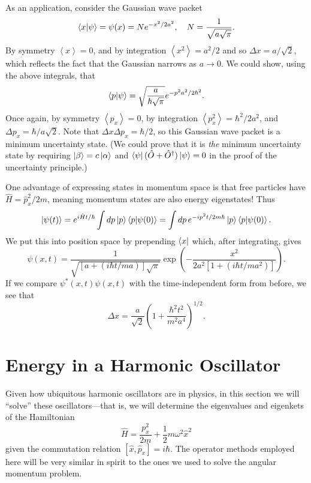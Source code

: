 \documentclass[../p116main.tex]{subfiles}
\begin{document}
As an application, consider the Gaussian wave packet
\[ \left< x \middle| \psi \right> = \psi(x) = N e^{-x^2 / 2a^2}, \quad N = \frac{1}{\sqrt{a \sqrt{\pi}}}. \]
By symmetry $\left< x \right> = 0$, and by integration $\left< x^2 \right> = a^2 / 2$ and so $\Delta x = a / \sqrt{2}$, which reflects the fact that the Gaussian narrows as $a \to 0$.
We could show, using the above integrals, that
\[ \left< p \middle| \psi \right> = \sqrt{\frac{a}{\hbar \sqrt{\pi}}} e^{-p^2 a^2 / 2\hbar^2}. \]
Once again, by symmetry $\left< p_x \right> = 0$, by integration $\left< p_x^2 \right> = \hbar^2 / 2a^2$, and $ \Delta p_x = \hbar / a \sqrt{2}$.
Note that $\Delta x \Delta p_x = \hbar / 2$, so this Gaussian wave packet is a minimum uncertainty state.
(We could prove that it is \textit{the} minimum uncertainty state by requiring $\left| \beta \right> = c \left| \alpha \right>$ and $\left< \psi \right| (\hat O + \hat O^\dagger) \left| \psi \right> = 0$ in the proof of the uncertainty principle.)

One advantage of expressing states in momentum space is that free particles have $\hat H = \hat p_x^2 / 2m$, meaning momentum states are also energy eigenstates!
Thus
\[ \left| \psi(t) \right> = e^{i \hat H t / \hbar} \int dp \left| p \right> \left< p \middle| \psi(0) \right> = \int dp \, e^{-ip^2 t / 2m\hbar} \left| p \right> \left< p \middle| \psi(0) \right>. \]
We put this into position space by prepending $\left< x \right|$ which, after integrating, gives
\[ \psi(x,t) = \frac{1}{\sqrt{[a + (i\hbar t / ma)] \sqrt{\pi}}} \exp \left( -\frac{x^2}{2a^2 [1 + (i\hbar t / ma^2)]} \right). \]
If we compare $\psi^*(x,t) \psi(x,t)$ with the time-independent form from before, we see that
\[ \Delta x = \frac{a}{\sqrt{2}} \left( 1 + \frac{\hbar^2 t^2}{m^2 a ^{4}} \right)^{1 / 2}. \]

\section{Energy in a Harmonic Oscillator}
Given how ubiquitous harmonic oscillators are in physics, in this section we will ``solve'' these oscillators---that is, we will determine the eigenvalues and eigenkets of the Hamiltonian
\[ \hat H = \frac{p_x^2}{2m} + \frac{1}{2} m \omega^2 \hat x^2 \]
given the commutation relation $[\hat x, \hat p_x] = i\hbar$.
The operator methods employed here will be very similar in spirit to the ones we used to solve the angular momentum problem.
\end{document}

